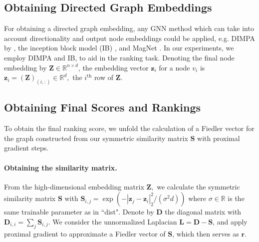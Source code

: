 \documentclass[nohyperref]{article}
\theoremstyle{plain}
\theoremstyle{definition}
\theoremstyle{remark}
\begin{document}
\subsection{Obtaining Directed Graph Embeddings}
For obtaining a directed graph embedding, any GNN method which can
take into account directionality and output node embeddings could be applied, e.g. DIMPA by \cite{he2021digrac}, the inception block model (IB) \cite{tong2020digraph}, and MagNet \cite{zhang2021magnet}. In our experiments, we employ DIMPA and IB, to aid in the ranking task.
Denoting the final node embedding by $\mathbf{Z}\in \mathbb{R}^{n \times d}$, the embedding vector $\mathbf{z}_i$ for a node $v_i$ is $\mathbf{z}_i=(\mathbf{Z})_{(i,:)} \in \mathbb{R}^{d}, $ the $i^\text{th}$ row of $\mathbf{Z}$. 

\subsection{Obtaining Final Scores and Rankings}
\label{subsec:proximal}

To obtain the final ranking score, we unfold the calculation of a Fiedler vector for the graph
constructed from our symmetric similarity matrix $\mathbf{S}$ with proximal gradient steps. 
\vspace{-6mm}
\paragraph{Obtaining the similarity matrix.}From the high-dimensional embedding matrix $\mathbf{Z},$ we calculate the symmetric similarity matrix $\mathbf{S}$ with $\mathbf{S}_{i,j}=\exp(-|\mathbf{z}_j-\mathbf{z}_i|_2^2/(\sigma^2d))$  
    where $\sigma\in\mathbb{R}$ is the same trainable parameter as in ``dist". 
    Denote by $\mathbf{D}$ the diagonal matrix with $\mathbf{D}_{i,i}=\sum_j\mathbf{S}_{i,j}$. 
    We consider the unnormalized Laplacian $\mathbf{L = D - S}$, and apply proximal gradient to approximate a Fiedler vector of $\mathbf{S}$,
    which then serves as $\mathbf{r}$.  
\vspace{-3mm}
\end{document}
